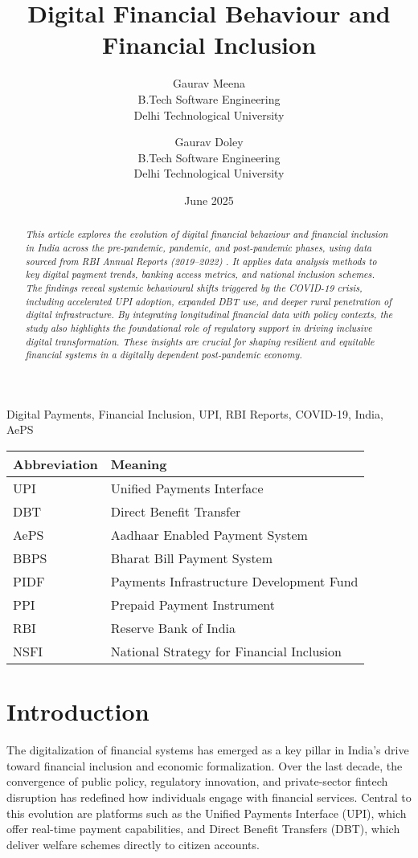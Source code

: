 \documentclass[conference]{IEEEtran}
\title{\Large Digital Financial Behaviour and Financial Inclusion}
\author{
    Gaurav Meena \\
    \small B.Tech Software Engineering\\ 
    \small Delhi Technological University\\
    \and
    Gaurav Doley \\
    \small B.Tech Software Engineering\\ 
    \small Delhi Technological University\\
}
\date{June 2025}
\begin{document}
\maketitle

\begin{abstract}
\textit{
    This article explores the evolution of digital financial behaviour and financial inclusion in India across the pre-pandemic, pandemic, and post-pandemic phases, using data sourced from RBI Annual Reports (2019–2022) \cite{rbi2019, rbi2020, rbi2021}. It applies data analysis methods to key digital payment trends, banking access metrics, and national inclusion schemes. The findings reveal systemic behavioural shifts triggered by the COVID-19 crisis, including accelerated UPI adoption, expanded DBT use, and deeper rural penetration of digital infrastructure. By integrating longitudinal financial data with policy contexts, the study also highlights the foundational role of regulatory support in driving inclusive digital transformation. These insights are crucial for shaping resilient and equitable financial systems in a digitally dependent post-pandemic economy.
}
\end{abstract}

\begin{IEEEkeywords}
Digital Payments, Financial Inclusion, UPI, RBI Reports, COVID-19, India, AePS
\end{IEEEkeywords}

\begin{table}[h]
\centering
\begin{tabular}{ll}
\textbf{Abbreviation} & \textbf{Meaning} \\
\hline
UPI & Unified Payments Interface \\
DBT & Direct Benefit Transfer \\
AePS & Aadhaar Enabled Payment System \\
BBPS & Bharat Bill Payment System \\
PIDF & Payments Infrastructure Development Fund \\
PPI & Prepaid Payment Instrument \\
RBI & Reserve Bank of India \\
NSFI & National Strategy for Financial Inclusion \\
\end{tabular}
\end{table}


\section{Introduction}
The digitalization of financial systems has emerged as a key pillar in India’s drive toward financial inclusion and economic formalization. Over the last decade, the convergence of public policy, regulatory innovation, and private-sector fintech disruption has redefined how individuals engage with financial services. Central to this evolution are platforms such as the Unified Payments Interface (UPI), which offer real-time payment capabilities, and Direct Benefit Transfers (DBT), which deliver welfare schemes directly to citizen accounts.
\end{document}
